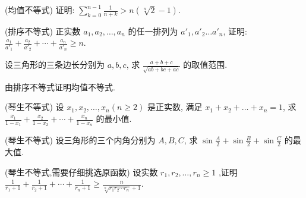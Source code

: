 \documentclass[a4paper , final]{ctexart}
\newenvironment{problem}[1]{%
  \item #1
  \par
  \vspace{8cm}
}{}
\begin{document}
\begin{problems}
  \begin{problem}
  {(均值不等式)
  证明: $\sum_{k=0}^{n-1} \frac{1}{n+k}>n(\sqrt[n]{2}-1)$.
  }
  \end{problem}

  \begin{problem}
  {(排序不等式)
  正实数 $a_1,a_2,\ldots,a_n$ 的任一排列为 ${a'}_1,{a'}_2\ldots {a'}_n$, 证明: $\frac{a_1}{{a'}_1}+\frac{a_2}{{a'}_2}+\cdots+\frac{a_n}{{a'}_n}\geq n$.
  }
  \end{problem}

  \begin{problem}
  {
  设三角形的三条边长分别为 $a,b,c$, 求 $\frac{a+b+c}{\sqrt{ab+bc+ac}}$ 的取值范围.
  }
  \end{problem}

  \begin{problem}
  {
  由排序不等式证明均值不等式.
  }
  \end{problem}

  \begin{problem}
  {(琴生不等式)
  设 $x_1,x_2,\ldots,x_n(n\ge 2)$ 是正实数, 满足 $x_1+x_2+\ldots+x_n=1$, 求 $\frac{x_1}{1-x_1}+\frac{x_2}{1-x_2}+\cdots+\frac{x_n}{1-x_n}$ 的最小值.
  }
  \end{problem}

  \begin{problem}
  {(琴生不等式)
  设三角形的三个内角分别为 $A,B,C$, 求 $\sin{\frac{A}{2}}+\sin{\frac{B}{2}}+\sin{\frac{C}{2}}$ 的最大值.
  }
  \end{problem}

  \begin{problem}
  {(琴生不等式,需要仔细挑选原函数)
  设实数 $r_1,r_2,\ldots,r_n\ge 1$ ,证明 $\frac{1}{r_1+1}+\frac{1}{r_2+1}+\cdots+\frac{1}{r_n+1}\ge \frac{n}{\sqrt[n]{r_1r_2\cdots r_n}+1}$.
  }
  \end{problem}
\end{problems}
\end{document}
